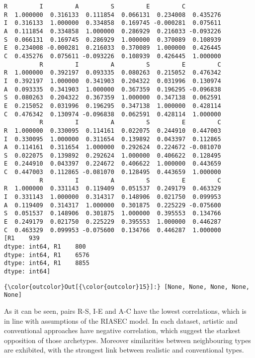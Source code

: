\documentclass[11pt]{article}
\begin{document}
    \begin{Verbatim}[commandchars=\\\{\}]
          R         I         A         S         E         C
R  1.000000  0.316133  0.111854  0.066131  0.234008  0.435276
I  0.316133  1.000000  0.334858  0.169745 -0.000281  0.075611
A  0.111854  0.334858  1.000000  0.286929  0.216033 -0.093226
S  0.066131  0.169745  0.286929  1.000000  0.370089  0.108939
E  0.234008 -0.000281  0.216033  0.370089  1.000000  0.426445
C  0.435276  0.075611 -0.093226  0.108939  0.426445  1.000000
          R         I         A         S         E         C
R  1.000000  0.392197  0.093335  0.080263  0.215052  0.476342
I  0.392197  1.000000  0.341903  0.204322  0.031996  0.130974
A  0.093335  0.341903  1.000000  0.367359  0.196295 -0.096838
S  0.080263  0.204322  0.367359  1.000000  0.347138  0.062591
E  0.215052  0.031996  0.196295  0.347138  1.000000  0.428114
C  0.476342  0.130974 -0.096838  0.062591  0.428114  1.000000
          R         I         A         S         E         C
R  1.000000  0.330095  0.114161  0.022075  0.244910  0.447003
I  0.330095  1.000000  0.311654  0.139892  0.043397  0.112865
A  0.114161  0.311654  1.000000  0.292624  0.224672 -0.081070
S  0.022075  0.139892  0.292624  1.000000  0.406622  0.128495
E  0.244910  0.043397  0.224672  0.406622  1.000000  0.443659
C  0.447003  0.112865 -0.081070  0.128495  0.443659  1.000000
          R         I         A         S         E         C
R  1.000000  0.331143  0.119409  0.051537  0.249179  0.463329
I  0.331143  1.000000  0.314317  0.148906  0.021750  0.099953
A  0.119409  0.314317  1.000000  0.301875  0.225229 -0.075600
S  0.051537  0.148906  0.301875  1.000000  0.395553  0.134766
E  0.249179  0.021750  0.225229  0.395553  1.000000  0.446287
C  0.463329  0.099953 -0.075600  0.134766  0.446287  1.000000
[R1    939
dtype: int64, R1    800
dtype: int64, R1    6576
dtype: int64, R1    8855
dtype: int64]

    \end{Verbatim}

            \begin{Verbatim}[commandchars=\\\{\}]
{\color{outcolor}Out[{\color{outcolor}15}]:} [None, None, None, None, None]
\end{Verbatim}
        
    As it can be seen, pairs R-S, I-E and A-C have the lowest correlations,
which is in line with assumptions of the RIASEC model. In each dataset,
artistic and conventional approaches have negative correlation, which
suggest the starkest opposition of those archetypes. Moreover
similarities between neighbouring types are exhibited, with the
strongest link between realistic and conventional types.
\end{document}
